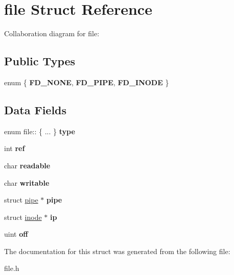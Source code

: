 \hypertarget{structfile}{}\section{file Struct Reference}
\label{structfile}


Collaboration diagram for file\+:
\subsection*{Public Types}
\begin{DoxyCompactItemize}
\item 
enum \{ {\bfseries F\+D\+\_\+\+N\+O\+NE}, 
{\bfseries F\+D\+\_\+\+P\+I\+PE}, 
{\bfseries F\+D\+\_\+\+I\+N\+O\+DE}
 \}\hypertarget{structfile_adcfd105f46b2868a7694fa7f38de263f}{}\label{structfile_adcfd105f46b2868a7694fa7f38de263f}

\end{DoxyCompactItemize}
\subsection*{Data Fields}
\begin{DoxyCompactItemize}
\item 
enum file\+:: \{ ... \}  {\bfseries type}\hypertarget{structfile_aeb945bc9619708cd2d5f7ae28faf922a}{}\label{structfile_aeb945bc9619708cd2d5f7ae28faf922a}

\item 
int {\bfseries ref}\hypertarget{structfile_a41c818f828adea488058bca63e4df23f}{}\label{structfile_a41c818f828adea488058bca63e4df23f}

\item 
char {\bfseries readable}\hypertarget{structfile_a0c5c8eced8bc562dbbecc8d450a6b646}{}\label{structfile_a0c5c8eced8bc562dbbecc8d450a6b646}

\item 
char {\bfseries writable}\hypertarget{structfile_a6e1b641ea1551ac4316a0c11a683df45}{}\label{structfile_a6e1b641ea1551ac4316a0c11a683df45}

\item 
struct \hyperlink{structpipe}{pipe} $\ast$ {\bfseries pipe}\hypertarget{structfile_a19d83a8d6cb47902fe8c762d2798c198}{}\label{structfile_a19d83a8d6cb47902fe8c762d2798c198}

\item 
struct \hyperlink{structinode}{inode} $\ast$ {\bfseries ip}\hypertarget{structfile_a4fd095f927715574dc2a4f243690e508}{}\label{structfile_a4fd095f927715574dc2a4f243690e508}

\item 
uint {\bfseries off}\hypertarget{structfile_a94a911be6cc1b1326728392d8b40150d}{}\label{structfile_a94a911be6cc1b1326728392d8b40150d}

\end{DoxyCompactItemize}


The documentation for this struct was generated from the following file\+:\begin{DoxyCompactItemize}
\item 
file.\+h\end{DoxyCompactItemize}
